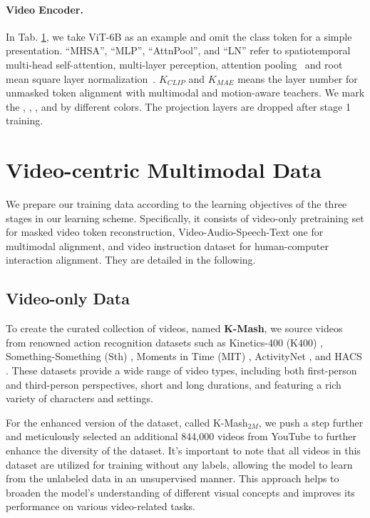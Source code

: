 \begin{table}[!th]
{\begin{tabular}{c|c|c}
        \bottomrule
        \end{tabular}
    }
    \label{tab:model_architecture}
    \vspace{-0.3cm}
\end{table}

\paragraph{Video Encoder.}
In Tab. \ref{tab:model_architecture}, we take ViT-6B as an example and omit the class token for a simple presentation. ``MHSA'', ``MLP'', ``AttnPool'', and ``LN'' refer to spatiotemporal multi-head self-attention, multi-layer perception, attention pooling~\cite{coca} and root mean square layer normalization~\cite{zhang2019root}. $K_{CLIP}$ and $K_{MAE}$ means the layer number for unmasked token alignment with multimodal and motion-aware teachers. We mark the , , , and  by different colors. The projection layers are dropped after stage 1 training.

% 
\section{Video-centric Multimodal Data}
We prepare our training data according to the learning objectives of the three stages in our learning scheme. Specifically, it consists of video-only pretraining set for masked video token reconstruction, Video-Audio-Speech-Text one for multimodal alignment, and video instruction dataset for human-computer interaction alignment. They are detailed in the following.

\subsection{Video-only Data}


To create the curated collection of videos, named \textbf{K-Mash}, we source videos from renowned action recognition datasets such as Kinetics-400 (K400) \cite{k400}, Something-Something (Sth) \cite{sth}, Moments in Time (MIT) \cite{mit}, ActivityNet \cite{activitynet}, and HACS \cite{hacs}. These datasets provide a wide range of video types, including both first-person and third-person perspectives, short and long durations, and featuring a rich variety of characters and settings.

For the enhanced version of the dataset, called K-Mash$_{2M}$, we push a step further and meticulously selected an additional 844,000 videos from YouTube to further enhance the diversity of the dataset. It's important to note that all videos in this dataset are utilized for training without any labels, allowing the model to learn from the unlabeled data in an unsupervised manner. This approach helps to broaden the model's understanding of different visual concepts and improves its performance on various video-related tasks. 

